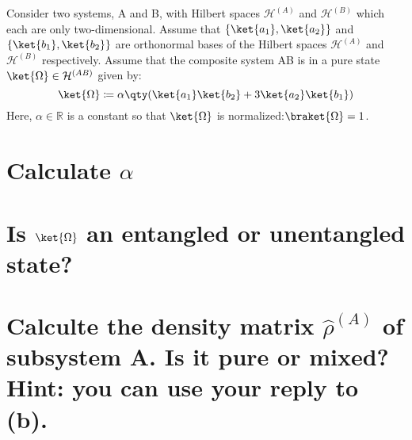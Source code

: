 \documentclass[boxes,pages]{homework}
\makeatletter
\newcommand{\hilb}{\mathcal{H}}
\numberwithin{@problem}{section}
\makeatother
\begin{document}
\begin{problem}
Consider two systems, A and B, with Hilbert spaces $\hilb^{(A)}$ and $\hilb^{(B)}$ which each are only two-dimensional. Assume that $\{\ket{a_1}, \ket{a_2}\}$ and $\{\ket{b_1}, \ket{b_2}\}$ are orthonormal bases of the Hilbert spaces $\hilb^{(A)}$ and $\hilb^{(B)}$ respectively. Assume that the composite system AB is in a pure state $\ket{\Omega}\in\hilb^{(AB)}$ given by:
\[
	\ket{\Omega}\coloneqq \alpha\qty(\ket{a_1}\ket{b_2} + 3\ket{a_2}\ket{b_1})
\]
Here, $\alpha\in\mathbb{R}$ is a constant so that $\ket{\Omega}$ is normalized:$\braket{\Omega} = 1$.
\begin{parts}
	\part{Calculate $\alpha$}\label{part:13a}
	\part{Is $\ket{\Omega}$ an entangled or unentangled state?}\label{part:13b}
	\part{Calculte the density matrix $\hat{\rho}^{(A)}$ of subsystem A. Is it pure or mixed? Hint: you can use your reply to (b).}\label{part:13c}
\end{parts}
\end{problem}
\end{document}
